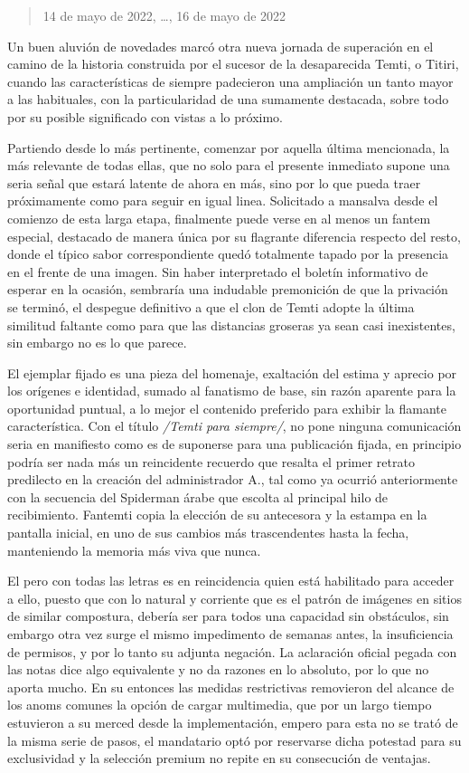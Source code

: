 \documentclass[
]{book}
\begin{document}
\begin{quote}
14 de mayo de 2022, \ldots, 16 de mayo de 2022
\end{quote}

Un buen aluvión de novedades marcó otra nueva jornada de superación en el camino de la historia construida por el sucesor de la desaparecida Temti, o Titiri, cuando las características de siempre padecieron una ampliación un tanto mayor a las habituales, con la particularidad de una sumamente destacada, sobre todo por su posible significado con vistas a lo próximo.

Partiendo desde lo más pertinente, comenzar por aquella última mencionada, la más relevante de todas ellas, que no solo para el presente inmediato supone una seria señal que estará latente de ahora en más, sino por lo que pueda traer próximamente como para seguir en igual linea. Solicitado a mansalva desde el comienzo de esta larga etapa, finalmente puede verse en al menos un fantem especial, destacado de manera única por su flagrante diferencia respecto del resto, donde el típico sabor correspondiente quedó totalmente tapado por la presencia en el frente de una imagen. Sin haber interpretado el boletín informativo de esperar en la ocasión, sembraría una indudable premonición de que la privación se terminó, el despegue definitivo a que el clon de Temti adopte la última similitud faltante como para que las distancias groseras ya sean casi inexistentes, sin embargo no es lo que parece.

El ejemplar fijado es una pieza del homenaje, exaltación del estima y aprecio por los orígenes e identidad, sumado al fanatismo de base, sin razón aparente para la oportunidad puntual, a lo mejor el contenido preferido para exhibir la flamante característica. Con el título \emph{/Temti para siempre/}, no pone ninguna comunicación seria en manifiesto como es de suponerse para una publicación fijada, en principio podría ser nada más un reincidente recuerdo que resalta el primer retrato predilecto en la creación del administrador A., tal como ya ocurrió anteriormente con la secuencia del Spiderman árabe que escolta al principal hilo de recibimiento. Fantemti copia la elección de su antecesora y la estampa en la pantalla inicial, en uno de sus cambios más trascendentes hasta la fecha, manteniendo la memoria más viva que nunca.

El pero con todas las letras es en reincidencia quien está habilitado para acceder a ello, puesto que con lo natural y corriente que es el patrón de imágenes en sitios de similar compostura, debería ser para todos una capacidad sin obstáculos, sin embargo otra vez surge el mismo impedimento de semanas antes, la insuficiencia de permisos, y por lo tanto su adjunta negación. La aclaración oficial pegada con las notas dice algo equivalente y no da razones en lo absoluto, por lo que no aporta mucho. En su entonces las medidas restrictivas removieron del alcance de los anoms comunes la opción de cargar multimedia, que por un largo tiempo estuvieron a su merced desde la implementación, empero para esta no se trató de la misma serie de pasos, el mandatario optó por reservarse dicha potestad para su exclusividad y la selección premium no repite en su consecución de ventajas.
\end{document}

